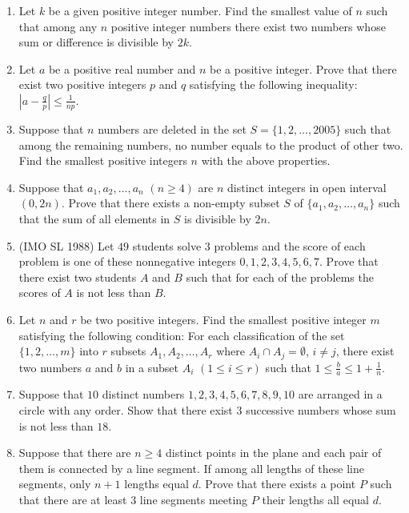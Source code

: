 \documentclass[11pt]{scrartcl}
\begin{document}
\begin{enumerate}
    \item Let $k$ be a given positive integer number. Find the smallest value of $n$ such that among any $n$ positive integer numbers there exist two numbers whose sum or difference is divisible by $2k$.
    
    \item Let $a$ be a positive real number and $n$ be a positive integer. Prove that there exist two positive integers $p$ and $q$ satisfying the following inequality: $\left|a-\frac{q}{p}\right| \le \frac{1}{np}$.
    
    \item Suppose that $n$ numbers are deleted in the set $S = \{1 ,2, \dots , 2005 \}$ such that among the remaining numbers, no number equals to the product of other two. Find the smallest positive integers $n$ with the above properties.
    
    \item Suppose that $a_1, a_2, \dots, a_n$ $(n \ge 4)$ are $n$ distinct integers in open interval $(0, 2n)$. Prove that there exists a non-empty subset $S$ of $\{a_1, a_2, \dots, a_n\}$ such that the sum of all elements in $S$ is divisible by $2n$.
    
    \item (IMO SL 1988) Let $49$ students solve $3$ problems and the score of each problem is one of these nonnegative integers $0, 1, 2, 3, 4, 5, 6, 7$. Prove that there exist two students $A$ and $B$ such that for each of the problems the scores of $A$ is not less than $B$.
    
    \item Let $n$ and $r$ be two positive integers. Find the smallest positive integer $m$ satisfying the following condition: For each classification of the set $\{1, 2, \dots, m \}$ into $r$ subsets $A_1, A_2, \dots, A_r$ where $A_i \cap A_j = \emptyset$, $i \neq j$, there exist two numbers $a$ and $b$ in a subset $A_i$ $(1 \le i \le r)$ such that $1 \le \frac{b}{a} \le 1 + \frac{1}{n}$.

    \item Suppose that $10$ distinct numbers $1, 2, 3, 4, 5, 6, 7,8, 9, 10$ are arranged in a circle with any order. Show that there exist $3$ successive numbers whose sum is not less than $18$.
    
    \item Suppose that there are $n \ge 4$ distinct points in the plane and each pair of them is connected by a line segment. If among all lengths of these line segments, only $n + 1$ lengths equal $d$. Prove that there exists a point $P$ such that there are at least $3$ line segments meeting $P$ their lengths all equal $d$.


\end{enumerate}
\end{document}
